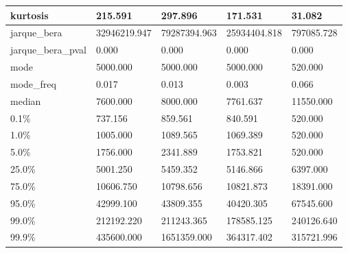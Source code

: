 \begin{table}[H]
\begin{tabular}{|l|m{10em}|m{10em}|m{10em}|m{10em}|}
\hline kurtosis & 215.591 & 297.896 & 171.531 & 31.082 \\
\hline jarque\_bera & 32946219.947 & 79287394.963 & 25934404.818 & 797085.728 \\
\hline jarque\_bera\_pval & 0.000 & 0.000 & 0.000 & 0.000 \\
\hline mode & 5000.000 & 5000.000 & 5000.000 & 520.000 \\
\hline mode\_freq & 0.017 & 0.013 & 0.003 & 0.066 \\
\hline median & 7600.000 & 8000.000 & 7761.637 & 11550.000 \\
\hline 0.1\% & 737.156 & 859.561 & 840.591 & 520.000 \\
\hline 1.0\% & 1005.000 & 1089.565 & 1069.389 & 520.000 \\
\hline 5.0\% & 1756.000 & 2341.889 & 1753.821 & 520.000 \\
\hline 25.0\% & 5001.250 & 5459.352 & 5146.866 & 6397.000 \\
\hline 75.0\% & 10606.750 & 10798.656 & 10821.873 & 18391.000 \\
\hline 95.0\% & 42999.100 & 43809.355 & 40420.305 & 67545.600 \\
\hline 99.0\% & 212192.220 & 211243.365 & 178585.125 & 240126.640 \\
\hline 99.9\% & 435600.000 & 1651359.000 & 364317.402 & 315721.996 \\
\hline
\end{tabular}
\end{table}
